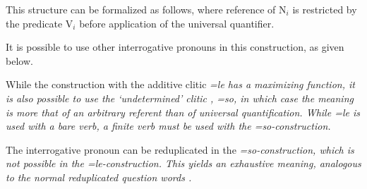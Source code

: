 This structure can be formalized as follows, where reference of N$_i$ is restricted by the predicate V$_i$ before application of the universal quantifier.


It is possible to use other interrogative pronouns in this construction, as given below.









While the construction with the additive clitic \em =le \em has a maximizing function, it is also possible to use the `undetermined' clitic \em, =so\em, in which case the meaning is more that of an arbitrary referent than of universal quantification. While \em =le \em is used with a bare verb, a finite verb must be used with the \em =so\em-construction.





The interrogative pronoun can be reduplicated in the \em =so\em-construction, which is not possible in the \em =le\em-construction. This yields an exhaustive meaning, analogous to the normal reduplicated question words .


